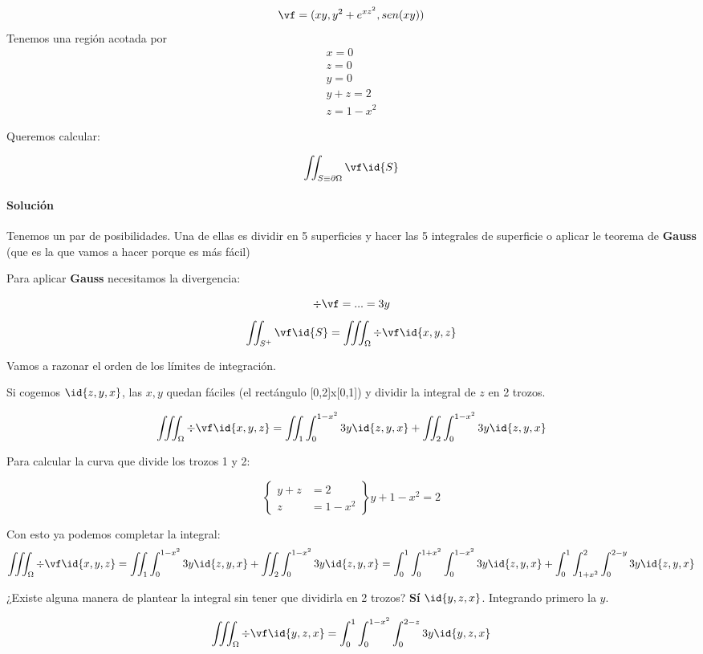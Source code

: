 \begin{example}
\[\vf = (xy,y^2+e^{xz^2},sen(xy))\]
Tenemos una región acotada por 
\begin{gather*}
x=0\\
z=0\\
y=0\\
y+z=2\\
z=1-x^2
\end{gather*}

Queremos calcular:

\[\iint_{S\equiv\partial \Omega} \vf \id{S}\]


\paragraph{Solución}

Tenemos un par de posibilidades. Una de ellas es dividir en 5 superficies y hacer las 5 integrales de superficie o aplicar le teorema de \textbf{Gauss} (que es la que vamos a hacer porque es más fácil)

Para aplicar \textbf{Gauss} necesitamos la divergencia:

\[\div\vf = ... = 3y\]
\[
\iint_{S^+} \vf \id{S} = \iiint_{\Omega} \div\vf \id{x,y,z}
\]

Vamos a razonar el orden de los límites de integración.

Si cogemos $\id{z,y,x}$, las $x,y$ quedan fáciles (el rectángulo [0,2]x[0,1]) y dividir la integral de $z$ en 2 trozos.

\[
\iiint_{\Omega} \div\vf \id{x,y,z} = \iint_{1} \int_0^{1-x^2} 3y\id{z,y,x} + \iint_{2} \int_0^{1-x^2} 3y\id{z,y,x}
\]

Para calcular la curva que divide los trozos 1 y 2:

\[\left\{\begin{array}{cc}
y+z&=2\\
z&=1-x^2
\end{array} \right\} y+1-x^2=2\]

Con esto ya podemos completar la integral:
\[
\iiint_{\Omega} \div\vf \id{x,y,z} = \iint_{1} \int_0^{1-x^2} 3y\id{z,y,x} + \iint_{2} \int_0^{1-x^2} 3y\id{z,y,x} = \int_0^1\int_0^{1+x^2}\int_0^{1-x^2}3y\id{z,y,x}+\int_0^1\int_{1+x^2}^{2}\int_0^{2-y}3y\id{z,y,x}
\]

¿Existe alguna manera de plantear la integral sin tener que dividirla en 2 trozos? \textbf{Sí} $\id{y,z,x}$. Integrando primero la $y$.

\[
\iiint_{\Omega} \div\vf\id{y,z,x} = \int_0^1\int_0^{1-x^2}\int_0^{2-z}3y\id{y,z,x}
\]

\end{example}




